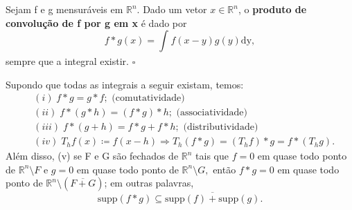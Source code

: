\documentclass[../distribution_theory_notes.tex]{subfiles}
\begin{document}
\begin{def*}
	Sejam f e g mensuráveis em \(\mathbb{R}^{n}\). Dado um vetor \(x\in \mathbb{R}^{n}\), o \textbf{produto de convolução de f por g em x} é dado por
	\[
		f*g(x)=\int_{}^{}f(x-y)g(y) \mathrm{dy},
	\]
	sempre que a integral existir. \(\square\)
\end{def*}
\begin{lemma*}
	Supondo que todas as integrais a seguir existam, temos:
	\begin{align*}
		 & (i)\;f*g = g*f; \text{ (comutatividade)}                               \\
		 & (ii)\;f*(g*h) = (f*g)*h; \text{ (associatividade)}                     \\
		 & (iii)\;f*(g+h) = f*g + f*h; \text{ (distributividade)}                 \\
		 & (iv)\; T_hf(x)\coloneqq f(x-h) \Rightarrow T_h(f*g)=(T_hf)*g=f*(T_hg).
	\end{align*}
	Além disso, (v) se F e G são fechados de \(\mathbb{R}^{n}\) tais que \(f=0\) em quase todo ponto de \(\mathbb{R}^{n}\setminus{F}\) e \(g=0\) em quase todo ponto de \(\mathbb{R}^{n}\setminus{G},\) então \(f*g=0\) em quase todo ponto de \(\mathbb{R}^{n}\setminus{(\overline{F+G})}\); em outras palavras,
	\[
		\mathrm{supp}(f*g)\subseteq \overline{\mathrm{supp}(f)+\mathrm{supp}(g)}.
	\]
\end{lemma*}
\end{document}
